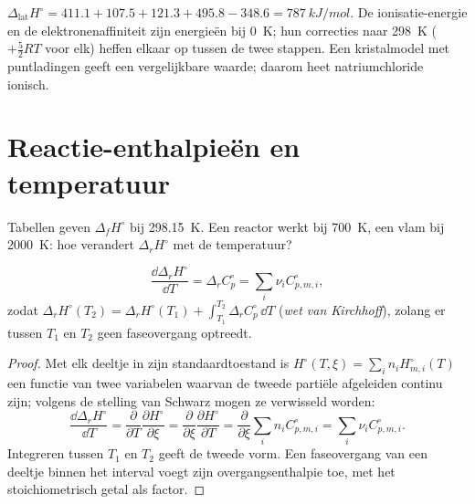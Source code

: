 \begin{example}[Natriumchloride]\label{ex:b2:reaction-enthalpy:nacl}
$\Delta_{\text{lat}}H^\circ = 411.1 + 107.5 + 121.3 + 495.8 - 348.6 =
\qty{787}{kJ/mol}$. De ionisatie-energie en de elektronenaffiniteit zijn
energieën bij \qty{0}{K}; hun correcties naar \qty{298}{K} ($+\tfrac52RT$
voor elk) heffen elkaar op tussen de twee stappen. Een kristalmodel met puntladingen
geeft een vergelijkbare waarde; daarom heet natriumchloride ionisch.
\end{example}

\section{Reactie-enthalpieën en temperatuur}

Tabellen geven $\Delta_f H^\circ$ bij \qty{298.15}{K}. Een reactor werkt bij
\qty{700}{K}, een vlam bij \qty{2000}{K}: hoe verandert $\Delta_r H^\circ$
met de temperatuur?

\begin{theorem}\label{thm:b2:reaction-enthalpy:kirchhoff}
\[
  \frac{\dd\Delta_r H^\circ}{\dd T} = \Delta_r C_p^\circ =
  \sum_i\nu_i C_{p,m,i}^\circ ,
\]
zodat $\Delta_r H^\circ(T_2) = \Delta_r H^\circ(T_1) + \int_{T_1}^{T_2}
\Delta_r C_p^\circ\,\dd T$ (\emph{wet van Kirchhoff}),
zolang er tussen $T_1$ en $T_2$ geen faseovergang optreedt.
\end{theorem}

\begin{proof}
Met elk deeltje in zijn standaardtoestand is $H^\circ(T, \xi) = \sum_in_i
H^\circ_{m,i}(T)$ een functie van twee variabelen waarvan de tweede partiële
afgeleiden continu zijn; volgens de stelling van Schwarz mogen ze verwisseld worden:
\[
  \frac{\dd\Delta_r H^\circ}{\dd T} = \frac{\partial}{\partial T}
  \frac{\partial H^\circ}{\partial\xi} = \frac{\partial}{\partial\xi}
  \frac{\partial H^\circ}{\partial T} = \frac{\partial}{\partial\xi}
  \sum_in_iC^\circ_{p,m,i} = \sum_i\nu_iC^\circ_{p,m,i}.
\]
Integreren tussen $T_1$ en $T_2$ geeft de tweede vorm. Een faseovergang
van een deeltje binnen het interval voegt zijn overgangsenthalpie toe,
met het stoichiometrisch getal als factor.
\end{proof}

